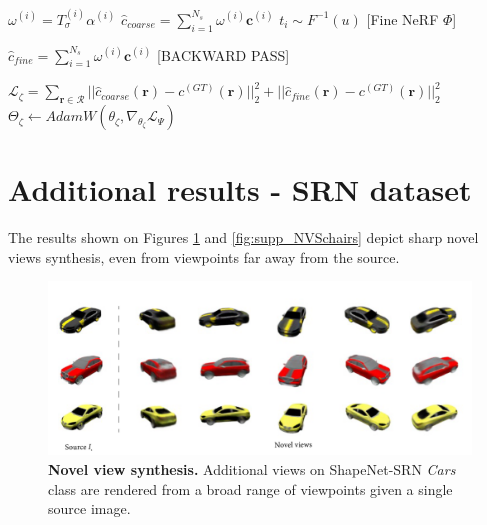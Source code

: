 \begin{algorithm}[htbp]
{{        $\omega^{(i)} = T_{\sigma}^{(i)}\alpha^{(i)}$  
        }
        \;
        $\hat{c}_{coarse} = \sum_{i=1}^{N_{s}}\omega^{(i)}\textbf{c}^{(i)}$ 
        $t_{i}\sim F^{-1}(u)$ 
        \;
        \textcolor{orange!50}{[Fine NeRF $\Phi$]}

        $\hat{c}_{fine} = \sum_{i=1}^{N_{s}}\omega^{(i)}\textbf{c}^{(i)}$ 
  \;
  \textcolor{red!50}{[BACKWARD PASS]}

    $\mathcal{L}_{\zeta}= \sum_{\mathbf{r}\in\mathcal{R}} || \hat{c}_{coarse}(\mathbf{r}) - c^{(GT)}(\mathbf{r}) ||_{2}^{2} +|| \hat{c}_{fine}(\mathbf{r}) - c^{(GT)}(\mathbf{r}) ||_{2}^{2}$
    $\Theta_{\zeta} \gets AdamW(\theta_{\zeta},\nabla_{\theta_{\zeta}} \mathcal{L}_{\Psi})$ 
    }
\end{algorithm}


\section{Additional results - SRN dataset }
\label{appendix:moreres-epinerf}

The results shown on Figures \ref{fig:supp_NVScars} and \ref{fig:supp_NVSchairs} depict  sharp novel views synthesis, even from viewpoints far away from the source. 

\begin{figure}[htp!]
   \begin{center}
  \includegraphics[width=\linewidth]{images/epinerf/supp_NVS_Cars.png}
  \caption{\textbf{Novel view synthesis.} Additional views on ShapeNet-SRN \textit{Cars} class are rendered from a broad range of viewpoints given a single source image. }
  \label{fig:supp_NVScars}
  \end{center}
\end{figure}



